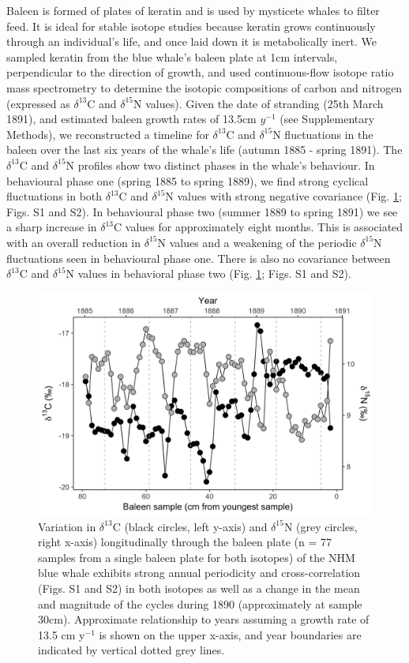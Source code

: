 \documentclass[a4paper,12pt]{article}
\begin{document}
Baleen is formed of plates of keratin and is used by mysticete whales to filter feed. 
It is ideal for stable isotope studies because keratin grows continuously through an individual's life, and once laid down it is metabolically inert\cite{best1996stable}. 
We sampled keratin from the blue whale's baleen plate at 1cm intervals, perpendicular to the direction of growth, and used continuous-flow isotope ratio mass spectrometry to determine the isotopic compositions of carbon and nitrogen (expressed as $\delta^{13}$C and $\delta^{15}$N values). 
Given the date of stranding (25th March 1891), and estimated baleen growth rates of 13.5cm $y^{-1}$ (see Supplementary Methods), we reconstructed a timeline for $\delta^{13}$C and $\delta^{15}$N fluctuations in the baleen over the last six years of the whale's life (autumn 1885 - spring 1891). 
The $\delta^{13}$C and $\delta^{15}$N profiles show two distinct phases in the whale's behaviour. 
In behavioural phase one (spring 1885 to spring 1889), we find strong cyclical fluctuations in both $\delta^{13}$C and $\delta^{15}$N values with strong negative covariance (Fig. \ref{fig1}; Figs. S1 and S2). 
In behavioural phase two (summer 1889 to spring 1891) we see a sharp increase in $\delta^{13}$C values for approximately eight months.
This is associated with an overall reduction in $\delta^{15}$N values and a weakening of the periodic $\delta^{15}$N fluctuations seen in behavioural phase one. 
There is also no covariance between $\delta^{13}$C and $\delta^{15}$N values in behavioral phase two (Fig. \ref{fig1}; Figs. S1 and S2). 

\begin{figure}
  \centering
  \includegraphics[width = \linewidth]{figures/Figure-1-raw-dC-dN-data.png}
  \caption{Variation in $\delta^{13}$C (black circles, left y-axis) and $\delta^{15}$N (grey circles, right x-axis) longitudinally through the baleen plate (n = 77 samples from a single baleen plate for both isotopes) of the NHM blue whale exhibits strong annual periodicity and cross-correlation (Figs. S1 and S2) in both isotopes as well as a change in the mean and magnitude of the cycles during 1890 (approximately at sample 30cm). Approximate relationship to years assuming a growth rate of 13.5 cm y$^{-1}$ is shown on the upper x-axis, and year boundaries are indicated by vertical dotted grey lines.}
  \label{fig1}
\end{figure}
\end{document}

